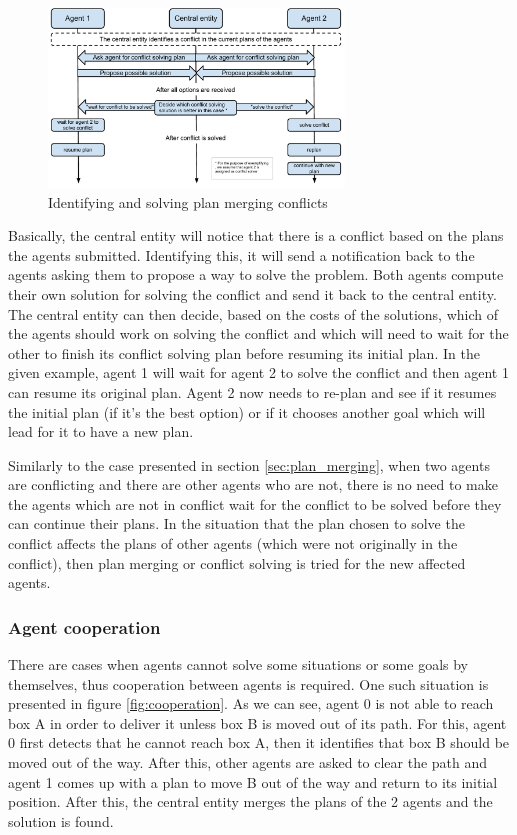 \begin{figure}[htb]
\begin{center}
 \includegraphics[width=0.7\textwidth]{figures/conflict_solving.pdf}
 \caption{Identifying and solving plan merging conflicts}
 \label{fig:conflict_solving}
\end{center}
\end{figure} 

Basically, the central entity will notice that there is a conflict based on the plans the agents submitted.
Identifying this, it will send a notification back to the agents asking them to propose a way to solve the
problem. Both agents compute their own solution for solving the conflict and send it back to the central
entity. The central entity can then decide, based on the costs of the solutions, which of the agents should
work on solving the conflict and which will need to wait for the other to finish its conflict solving plan
before resuming its initial plan. In the given example, agent 1 will wait for agent 2 to solve the conflict
and then agent 1 can resume its original plan. Agent 2 now needs to re-plan and see if it resumes the initial
plan (if it’s the best option) or if it chooses another goal which will lead for it to have a new plan.

Similarly to the case presented in section \ref{sec:plan_merging}, when two agents are conflicting and there
are other agents who are not, there is no need to make the agents which are not in conflict wait for the
conflict to be solved before they can continue their plans. In the situation that the plan chosen to solve
the conflict affects the plans of other agents (which were not originally in the conflict), then plan merging
or conflict solving is tried for the new affected agents.

\subsubsection{Agent cooperation}
There are cases when agents cannot solve some situations or some goals by themselves, thus cooperation between
agents is required. One such situation is presented in figure \ref{fig:cooperation}. As we can see, agent 0 is
not able to reach box A in order to deliver it unless box B is moved out of its path. For this, agent 0 first
detects that he cannot reach box A, then it identifies that box B should be moved out of the way. After this,
other agents are asked to clear the path and agent 1 comes up with a plan to move B out of the way and return
to its initial position. After this, the central entity merges the plans of the 2 agents and the solution is
found.

